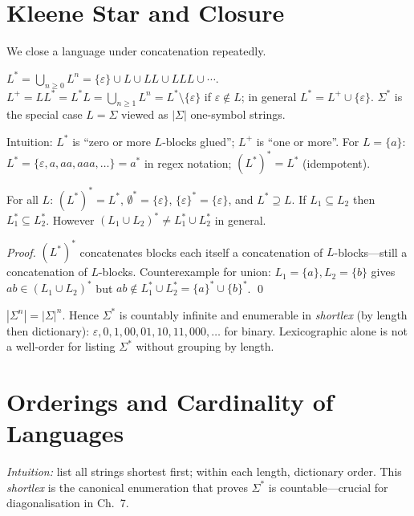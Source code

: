 \section{Kleene Star and Closure}
\label{sec:kleene}
We close a language under concatenation repeatedly.

\begin{definition}
$L^*=\bigcup_{n\ge0}L^n=\{\varepsilon\}\cup L\cup LL\cup LLL\cup\cdots$. $L^+=LL^*=L^*L=\bigcup_{n\ge1}L^n=L^*\setminus\{\varepsilon\}$ if $\varepsilon\notin L$; in general $L^*=L^+\cup\{\varepsilon\}$. $\Sigma^*$ is the special case $L=\Sigma$ viewed as $|\Sigma|$ one-symbol strings.
\end{definition}

Intuition: $L^*$ is ``zero or more $L$-blocks glued''; $L^+$ is ``one or more''. For $L=\{a\}$: $L^*=\{\varepsilon,a,aa,aaa,\dots\}=a^*$ in regex notation; $(L^*)^*=L^*$ (idempotent).

\begin{theorem}
For all $L$: $(L^*)^*=L^*$, $\emptyset^*=\{\varepsilon\}$, $\{\varepsilon\}^*=\{\varepsilon\}$, and $L^*\supseteq L$. If $L_1\subseteq L_2$ then $L_1^*\subseteq L_2^*$. However $(L_1\cup L_2)^*\neq L_1^*\cup L_2^*$ in general.
\end{theorem}
\begin{proof}
$(L^*)^*$ concatenates blocks each itself a concatenation of $L$-blocks---still a concatenation of $L$-blocks. Counterexample for union: $L_1=\{a\},L_2=\{b\}$ gives $ab\in(L_1\cup L_2)^*$ but $ab\notin L_1^*\cup L_2^*=\{a\}^*\cup\{b\}^*$. \qed
\end{proof}

\begin{example}
$|\Sigma^n|=|\Sigma|^n$. Hence $\Sigma^*$ is countably infinite and enumerable in \emph{shortlex} (by length then dictionary): $\varepsilon,0,1,00,01,10,11,000,\dots$ for binary. Lexicographic alone is not a well-order for listing $\Sigma^*$ without grouping by length.
\end{example}

\section{Orderings and Cardinality of Languages}
\label{sec:ordering}
\emph{Intuition:} list all strings shortest first; within each length, dictionary order. This \emph{shortlex} is the canonical enumeration that proves $\Sigma^*$ is countable---crucial for diagonalisation in Ch.~7.

